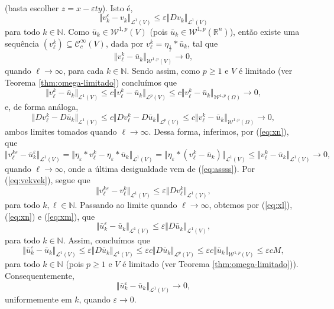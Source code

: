 \documentclass[a4paper, 11pt]{book}
\theoremstyle{definition}
\newcommand{\bN}{\mathbb{N}}
\newcommand{\bR}{\mathbb{R}}
\newcommand{\cC}{\mathcal{C}}
\newcommand{\cL}{\mathcal{L}}
\newcommand{\cW}{\mathcal{W}}
\begin{document}
\begin{prf}
\[\begin{aligned}
        \end{aligned}
    \]
    (basta escolher $z = x - \varepsilon t y$).
    Isto é,
    \begin{equation} \label{eq:vekvek}
        \Vert v_k^\varepsilon - v_k \Vert_{\cL^1(V)} \leqslant \varepsilon \Vert Dv_k \Vert_{\cL^1(V)}
    \end{equation}
    para todo $k \in \bN$. Como $\bar u_k \in \cW^{1,p}(V) $ (pois $\bar u_k \in \cW^{1,p}(\bR^n)$), então existe uma sequência $(v^k_\ell) \subseteq \cC^{\infty}_c(V)$, dada por $v^k_\ell = \eta_{\frac{1}{\ell}} * \bar{u}_k$, tal que
    \[
        \Vert v^k_\ell - \bar{u}_k \Vert_{\cW^{1,p}(V)} \to 0,
    \]
    quando $\ell \to \infty$, para cada $k \in \bN$.
    Sendo assim, como $p \geqslant 1$ e $V$ é limitado (ver Teorema \ref{thm:omega-limitado}) concluímos que
    \begin{equation} \label{eq:xl}
        \Vert v^k_\ell - \bar{u}_k \Vert_{\cL^1(V)} \leqslant c \Vert v^k_\ell - \bar{u}_k \Vert_{\cL^p(V)} \leqslant c \Vert v^k_\ell - \bar{u}_k \Vert_{\cW^{1,p}(\Omega)} \to 0,
    \end{equation}
    e, de forma análoga,
    \begin{equation} \label{eq:xn}
        \Vert Dv^k_\ell - D\bar{u}_k \Vert_{\cL^1(V)}\leqslant c \Vert Dv^k_\ell - D\bar{u}_k \Vert_{\cL^p(V)} \leqslant c \Vert v^k_\ell - \bar{u}_k \Vert_{\cW^{1,p}(\Omega)} \to 0,
    \end{equation}
    ambos limites tomados quando $\ell \to \infty$. Dessa forma, inferimos, por (\ref{eq:xn}), que
    \begin{equation} \label{eq:xm}
        \Vert v^{k\varepsilon}_\ell - \bar u_k^{\varepsilon} \Vert_{\cL^1(V)} = \Vert \eta_\varepsilon * v^k_\ell - \eta_\varepsilon * \bar u_k \Vert_{\cL^1(V)} = \Vert \eta_\varepsilon  * (v^k_\ell - \bar u_k) \Vert_{\cL^1(V)} \leqslant \Vert v^k_\ell - \bar u_k \Vert_{\cL^1(V)} \to 0,
    \end{equation}
    quando $\ell \to \infty$, onde a última desigualdade vem de (\ref{eq:assss}).
    Por (\ref{eq:vekvek}), segue que
    \[
        \Vert v^{k\varepsilon}_\ell - v^k_\ell \Vert_{\cL^1(V)} \leqslant \varepsilon \Vert D v^k_\ell \Vert_{\cL^1(V)},
    \]
    para todo $k,\ell \in \bN$. Passando ao limite quando $\ell \to \infty$, obtemos por (\ref{eq:xl}), (\ref{eq:xn}) e (\ref{eq:xm}), que
    \[
        \Vert \bar u_k^\varepsilon - \bar u_k \Vert_{\cL^1(V)} \leqslant \varepsilon \Vert D\bar u_k \Vert_{\cL^1(V)},
    \]
    para todo $k \in \bN$. Assim, concluímos que
    \[
        \Vert \bar u_k^\varepsilon - \bar u_k \Vert_{\cL^1(V)} \leqslant \varepsilon \Vert D\bar u_k \Vert_{\cL^1(V)} \leqslant \varepsilon c \Vert D\bar u_k \Vert_{\cL^p(V)} \leqslant \varepsilon c \Vert \bar u_k \Vert_{\cW^{1,p}(V)} \leqslant \varepsilon c M,
    \]
    para todo $k \in \bN$ (pois $p \geqslant 1$ e $V$ é limitado (ver Teorema \ref{thm:omega-limitado})). Consequentemente,
    \begin{equation} \label{eq:eml1converge2}
        \Vert \bar u_k^\varepsilon - \bar u_k \Vert_{\cL^1 (V)} \to 0,
    \end{equation}
    uniformemente em $k$, quando $\varepsilon \to 0$. 
    

\end{prf}
\end{document}
